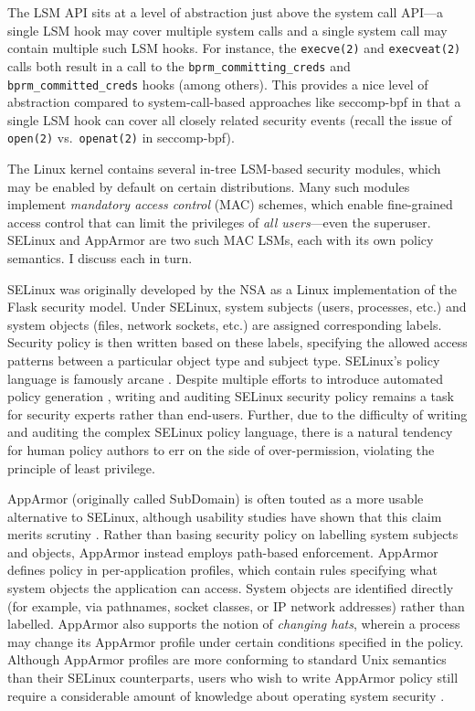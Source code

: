 The LSM API sits at a level of abstraction just above the system call API---a single LSM hook may cover multiple system calls and a single system call may contain multiple such LSM hooks. For instance, the \texttt{execve(2)} and \texttt{execveat(2)} calls both result in a call to the \texttt{bprm\_committing\_creds} and  \texttt{bprm\_committed\_creds} hooks (among others).  This provides a nice level of abstraction compared to system-call-based approaches like seccomp-bpf \cite{seccomp_bpf, drewry2012_seccomp_bpf} in that a single LSM hook can cover all closely related security events (recall the issue of \texttt{open(2)} vs.~\texttt{openat(2)} in seccomp-bpf).

The Linux kernel contains several in-tree LSM-based security modules, which may be enabled by default on certain distributions.  Many such modules implement \textit{mandatory access control} (MAC) schemes, which enable fine-grained access control that can limit the privileges of \textit{all users}---even the superuser. SELinux \cite{smalley2001_selinux} and AppArmor \cite{cowan2000_apparmor} are two such MAC LSMs, each with its own policy semantics. I discuss each in turn.

SELinux \cite{smalley2001_selinux} was originally developed by the NSA as a Linux implementation of the Flask \cite{spencer1999_flask} security model.  Under SELinux, system subjects (users, processes, etc.) and system objects (files, network sockets, etc.) are assigned corresponding labels. Security policy is then written based on these labels, specifying the allowed access patterns between a particular object type and subject type. SELinux's policy language is famously arcane \cite{schreuders12_towards}. Despite multiple efforts to introduce automated policy generation \cite{audit2allow, macmillan07_madison, sniffen06_guided}, writing and auditing SELinux security policy remains a task for security experts rather than end-users. Further, due to the difficulty of writing and auditing the complex SELinux policy language, there is a natural tendency for human policy authors to err on the side of over-permission, violating the principle of least privilege.

AppArmor (originally called SubDomain) \cite{cowan2000_apparmor} is often touted as a more usable alternative to SELinux, although usability studies have shown that this claim merits scrutiny \cite{schreuders12_towards}. Rather than basing security policy on labelling system subjects and objects, AppArmor instead employs path-based enforcement. AppArmor defines policy in per-application profiles, which contain rules specifying what system objects the application can access. System objects are identified directly (for example, via pathnames, socket classes, or IP network addresses) rather than labelled.  AppArmor also supports the notion of \textit{changing hats}, wherein a process may change its AppArmor profile under certain conditions specified in the policy.  Although AppArmor profiles are more conforming to standard Unix semantics than their SELinux counterparts, users who wish to write AppArmor policy still require a considerable amount of knowledge about operating system security \cite{schreuders12_towards}.

